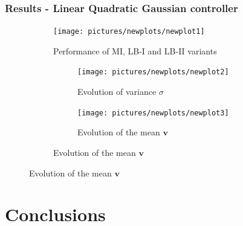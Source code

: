 \documentclass{beamer}
\newcommand{\vv}{\boldsymbol{v}}
\begin{document}
%
%

\begin{frame}
\frametitle{Results - Linear Quadratic Gaussian controller}

\vspace{-0.6cm}
\begin{figure}[p]
\begin{subfigure}[p]{0.54\textwidth}
\texttt{[image: pictures/newplots/newplot1]}
\caption{Performance of MI, LB-I and LB-II variants}
\end{subfigure}
\hfill
\begin{subfigure}[p]{0.45\textwidth}
\begin{subfigure}[t]{\textwidth}
\centering
\texttt{[image: pictures/newplots/newplot2]}
\caption{Evolution of variance $\sigma$}
\end{subfigure}
\vfill
\begin{subfigure}[b]{\textwidth}
\centering
\texttt{[image: pictures/newplots/newplot3]}
\caption{Evolution of the mean $\vv$}
\end{subfigure}
\end{subfigure}

\end{figure}
\end{frame}

\section{Conclusions}
\end{document}
